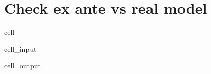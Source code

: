 \documentclass[letterpaper,10pt,english]{jupyterBook}
\begin{document}
\section{Check ex ante vs real model}
\label{\detokenize{content/howto/modifymodel/create_real_model:check-ex-ante-vs-real-model}}
\begin{sphinxuseclass}{cell}\begin{sphinxVerbatimInput}

\begin{sphinxuseclass}{cell_input}
\begin{sphinxVerbatim}[commandchars=\\\{\}]
 
\end{sphinxVerbatim}

\end{sphinxuseclass}\end{sphinxVerbatimInput}
\begin{sphinxVerbatimOutput}

\begin{sphinxuseclass}{cell_output}
\noindent{}

\noindent{}

\noindent{}

\end{sphinxuseclass}\end{sphinxVerbatimOutput}

\end{sphinxuseclass}
\end{document}
